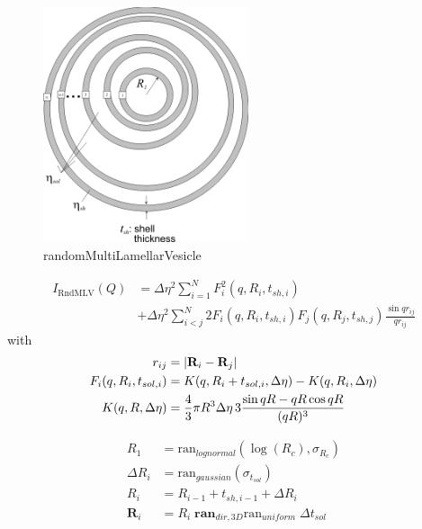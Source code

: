 \begin{figure}[htb]
\begin{center}
\includegraphics[width=0.537\textwidth,height=0.566\textwidth]{../images/form_factor/spheres/random_multilamellar_vesicle.png}
\end{center}
\caption{randomMultiLamellarVesicle}
\label{fig:randomMultiLamellarVesicle}
\end{figure}
\begin{align}
I_\text{RndMLV}(Q) &= \Delta\eta ^2 \sum_{i=1}^{N} F_i^2(q,R_i,t_{sh,i}) \nonumber \\
&+ \Delta\eta ^2 \sum_{i<j}^{N} 2 F_i(q,R_i,t_{sh,i}) F_j(q,R_j,t_{sh,j}) \frac{\sin qr_{ij}}{qr_{ij}}
\end{align}
with
\begin{subequations}
\begin{align}
r_{ij} & = \abs{\mathbf{R}_i-\mathbf{R}_j} \\
F_i(q,R_i,t_{sol,i}) &= K(q,R_i+t_{sol,i},\Delta\eta)-K(q,R_i,\Delta\eta)\\
K(q,R,\Delta\eta) &= \frac{4}{3}\pi R^3 \Delta\eta \, 3 \frac{\sin qR - qR \cos qR}{(qR)^3}
\end{align}
\end{subequations}

\begin{subequations}
\begin{align}
R_1 &= \textrm{ran}_{lognormal}\left(\log(R_c),\sigma_{R_c}\right) \\
\Delta R_{i} &= \textrm{ran}_{gaussian}\left(\sigma_{t_{sol}}\right) \\
R_i &= R_{i-1}+t_{sh,i-1}+\Delta R_{i}\\
\mathbf{R}_i &= R_i \; \textbf{ran}_{dir,3D}
                       \text{ran}_{uniform} \; \Delta t_{sol}
\end{align}
\end{subequations}


